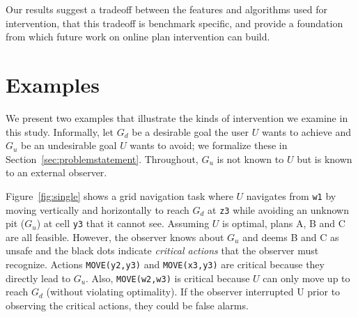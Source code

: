 \documentclass[letterpaper]{article}
\theoremstyle{plain}
\begin{document}
Our results suggest a tradeoff between the features and algorithms used for intervention, that this tradeoff is benchmark specific, and provide a foundation from which future work on online plan intervention can build.




\section{Examples}
\label{sec:example}

We present two examples that illustrate the kinds of intervention we examine in this study.
Informally, let $G_d$ be a desirable goal the user $U$ wants to achieve and $G_u$ be  an undesirable goal $U$ wants to avoid; we formalize these in Section~\ref{sec:problemstatement}.
Throughout, $G_u$ is not known to $U$ but is known to an external observer.

Figure~\ref{fig:single} shows a grid navigation task where $U$ navigates from \texttt{w1} by moving vertically and horizontally to reach $G_d$ at \texttt{z3} while avoiding an unknown pit ($G_u$) at cell \texttt{y3} that it cannot see. 
Assuming $U$ is optimal, plans A, B and C are all feasible. 
However, the observer knows about $G_u$  and deems B and C as unsafe and the black dots indicate \emph{critical actions} that the observer must recognize. 
Actions \texttt{MOVE(y2,y3)} and \texttt{MOVE(x3,y3)} are critical because they directly lead to $G_u$. 
Also, \texttt{MOVE(w2,w3)} is critical because $U$ can only move up to reach $G_d$ (without violating optimality). 
If the observer interrupted U prior to observing the critical actions, they could be false alarms.
\end{document}
